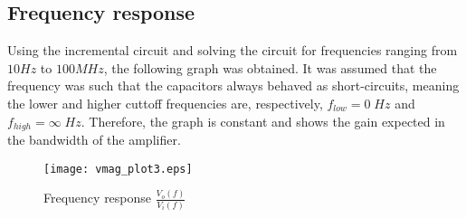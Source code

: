 
\subsection{Frequency response}
Using the incremental circuit and solving the circuit for frequencies ranging from $10 Hz$ to $100 MHz$, the following graph was obtained. It was assumed that the frequency was such that the capacitors always behaved as short-circuits, meaning the lower and higher cuttoff frequencies are, respectively, $f_{low} = 0 \;Hz$ and $f_{high} = \infty \;Hz$. Therefore, the graph is constant and shows the gain expected in the bandwidth of the amplifier.

\begin{figure}[H] \centering
\texttt{[image: vmag\_plot3.eps]}
\caption{Frequency response $\frac{V_o(f)}{V_i(f)}$}
\label{fig:freq_response}
\end{figure}







